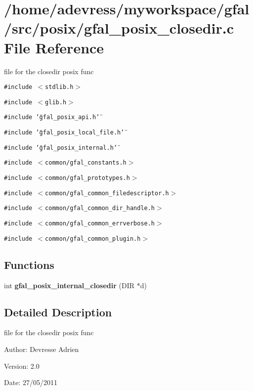 \section{/home/adevress/myworkspace/gfal/src/posix/gfal\_\-posix\_\-closedir.c File Reference}
\label{gfal__posix__closedir_8c}
file for the closedir posix func 

{\tt \#include $<$stdlib.h$>$}\par
{\tt \#include $<$glib.h$>$}\par
{\tt \#include \char`\"{}gfal\_\-posix\_\-api.h\char`\"{}}\par
{\tt \#include \char`\"{}gfal\_\-posix\_\-local\_\-file.h\char`\"{}}\par
{\tt \#include \char`\"{}gfal\_\-posix\_\-internal.h\char`\"{}}\par
{\tt \#include $<$common/gfal\_\-constants.h$>$}\par
{\tt \#include $<$common/gfal\_\-prototypes.h$>$}\par
{\tt \#include $<$common/gfal\_\-common\_\-filedescriptor.h$>$}\par
{\tt \#include $<$common/gfal\_\-common\_\-dir\_\-handle.h$>$}\par
{\tt \#include $<$common/gfal\_\-common\_\-errverbose.h$>$}\par
{\tt \#include $<$common/gfal\_\-common\_\-plugin.h$>$}\par
\subsection*{Functions}
\begin{CompactItemize}
\item 
int \textbf{gfal\_\-posix\_\-internal\_\-closedir} (DIR $\ast$d)\label{gfal__posix__closedir_8c_3137761fa72f5cd168e84d82800a08be}

\end{CompactItemize}


\subsection{Detailed Description}
file for the closedir posix func 

\begin{Desc}
\item[Author:]Devresse Adrien \end{Desc}
\begin{Desc}
\item[Version:]2.0 \end{Desc}
\begin{Desc}
\item[Date:]27/05/2011 \end{Desc}
